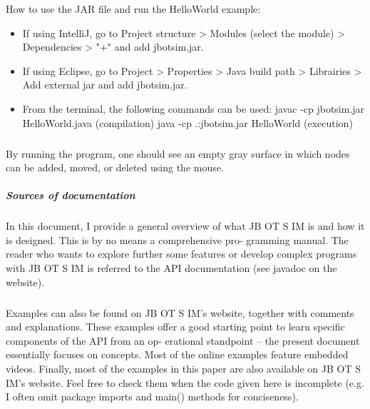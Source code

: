 How to use the JAR file and run the HelloWorld example:
\begin{itemize}
	\item If using IntelliJ, go to Project structure > Modules (select the module) > Dependencies > "+" and add jbotsim.jar.
	\item If using Eclipse, go to Project > Properties > Java build path > Librairies > Add external jar and add jbotsim.jar.
	\item From the terminal, the following commands can be used: javac -cp jbotsim.jar HelloWorld.java (compilation) java -cp .:jbotsim.jar HelloWorld (execution)
\end{itemize}
\subparagraph{}By running the program, one should see an empty gray surface in which nodes can be added, moved, or deleted using the mouse.
\subparagraph{Sources of documentation}In this document, I provide a general overview of what JB OT S IM is and how it is designed. This is by no means a comprehensive pro- gramming manual. The reader who wants to explore further some features or develop complex programs with JB OT S IM is referred to the API documentation (see javadoc on the website). \subparagraph{}Examples can also be found on JB OT S IM’s website, together with comments and explanations. These examples offer a good starting point to learn specific components of the API from an op- erational standpoint – the present document essentially focuses on concepts. Most of the online examples feature embedded videos. Finally, most of the examples in this paper are also available on JB OT S IM’s website. Feel free to check them when the code given here is incomplete (e.g. I often omit package imports and main() methods for conciseness).

